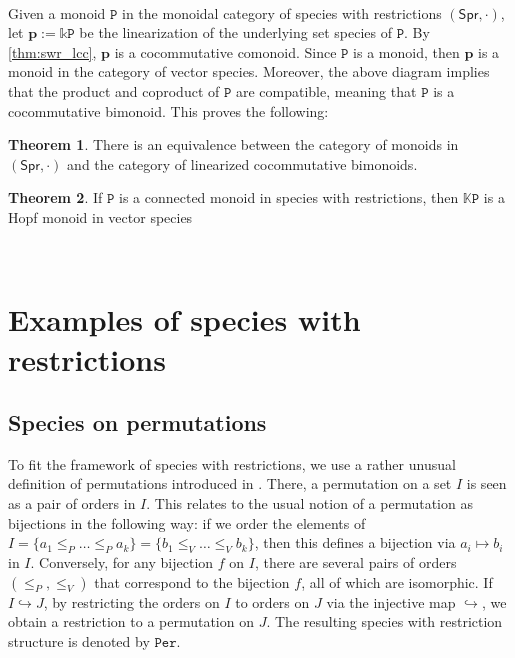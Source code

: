 \documentclass[12pt, reqno]{amsart}
\theoremstyle{definition}
\newtheorem{thm}{Theorem}[section]
\newcommand{\Spr}{\mathsf{Spr}} %
\newcommand{\prP}{\mathtt{P}}
\newcommand{\tp}{\mathbf{p}}
\begin{document}
\

Given a monoid $\prP$ in the monoidal category of species with restrictions $(\Spr, \cdot)$, let $\tp:=\mathbb{k}\prP$ be the linearization of the underlying set species of $\prP$. 
By \cref{thm:swr_lcc}, $\tp$ is a cocommutative comonoid. Since $\prP$ is a monoid, then $\tp$ is a monoid in the category of vector species. Moreover, the above diagram implies that the product and coproduct of $\prP$ are compatible, meaning that $\prP$ is a cocommutative bimonoid. 
This proves the following:

\begin{thm}
There is an equivalence between the category of monoids in $(\Spr, \cdot)$ and the category of linearized cocommutative bimonoids.
\end{thm}


\begin{thm}
If $\prP$ is a connected monoid in species with restrictions, then $\mathbb{K}\prP$ is a Hopf monoid in vector species
\end{thm}


\

\section{Examples of species with restrictions \label{sec:species_restrictions}}


\subsection{Species on permutations}

To fit the framework of species with restrictions, we use a rather unusual definition of permutations introduced in \cite{albert2020two}.
There, a permutation on a set $I$ is seen as a pair of orders in $I$.
This relates to the usual notion of a permutation as bijections in the following way: if we order the elements of $I = \{a_1 \leq_P \dots \leq_P a_k \} = \{ b_1 \leq_V \dots \leq_V b_k \}$, then this defines a bijection via $a_i \mapsto b_i $ in $I$.
Conversely, for any bijection $f$ on $I$, there are several pairs of orders $(\leq_P, \leq_V)$ that correspond to the bijection $f$, all of which are isomorphic.
If $I \hookrightarrow J$, by restricting the orders on $I$ to orders on $J$ via the injective map $\hookrightarrow $, we obtain a restriction to a permutation on $J$.
The resulting species with restriction structure is denoted by $\mathtt{Per}$.

\
\end{document}
